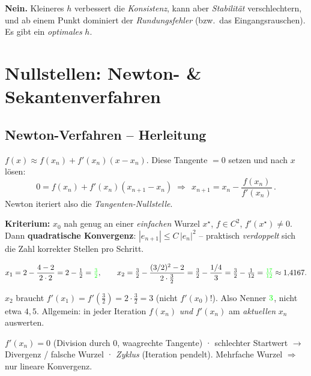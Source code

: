 \documentclass[a4paper,11pt]{article}
\newcommand{\f}[1]{\textcolor{green}{#1}}
\begin{document}
\begin{merke}
\textbf{Nein.} Kleineres $h$ verbessert die \emph{Konsistenz}, kann aber \emph{Stabilität}
verschlechtern, und ab einem Punkt dominiert der \emph{Rundungsfehler} (bzw.\ das Eingangsrauschen).
Es gibt ein \emph{optimales} $h$.
\end{merke}

\section{Nullstellen: Newton- \& Sekantenverfahren}

\subsection{Newton-Verfahren -- Herleitung}
\begin{formel}
$f(x)\approx f(x_n)+f'(x_n)(x-x_n)$. Diese Tangente $=0$ setzen und nach $x$ lösen:
\[ 0=f(x_n)+f'(x_n)(x_{n+1}-x_n)\;\Rightarrow\; \boxed{\,x_{n+1}=x_n-\dfrac{f(x_n)}{f'(x_n)}\,}. \]
Newton iteriert also die \emph{Tangenten-Nullstelle}.
\end{formel}

\begin{formel}[Konvergenz]
\textbf{Kriterium:} $x_0$ nah genug an einer \emph{einfachen} Wurzel $x^\star$, $f\in C^2$,
$f'(x^\star)\neq0$. Dann \textbf{quadratische Konvergenz}: $|e_{n+1}|\le C\,|e_n|^2$ -- praktisch
\emph{verdoppelt} sich die Zahl korrekter Stellen pro Schritt.
\end{formel}

\begin{beispiel}[$f(x)=x^2-2$ ($\sqrt2$), $x_0=2$, $f'=2x$]
\[ x_1=2-\frac{4-2}{2\cdot2}=2-\tfrac12=\f{\tfrac32},\qquad
   x_2=\tfrac32-\frac{(3/2)^2-2}{2\cdot\frac32}=\tfrac32-\frac{1/4}{3}=\tfrac32-\tfrac1{12}=\f{\tfrac{17}{12}}\approx1{,}4167. \]
\end{beispiel}

\begin{achtung}
$x_2$ braucht $f'(x_1)=f'(\tfrac32)=2\cdot\tfrac32=3$ (nicht $f'(x_0)$!). Also Nenner $\f{3}$,
nicht etwa $4{,}5$. Allgemein: in jeder Iteration $f(x_n)$ \emph{und} $f'(x_n)$ am \emph{aktuellen}
$x_n$ auswerten.
\end{achtung}

\begin{formel}
$f'(x_n)=0$ (Division durch $0$, waagrechte Tangente) \;·\; schlechter Startwert $\to$ Divergenz / falsche
Wurzel \;·\; \emph{Zyklus} (Iteration pendelt). Mehrfache Wurzel $\Rightarrow$ nur lineare Konvergenz.
\end{formel}
\end{document}
